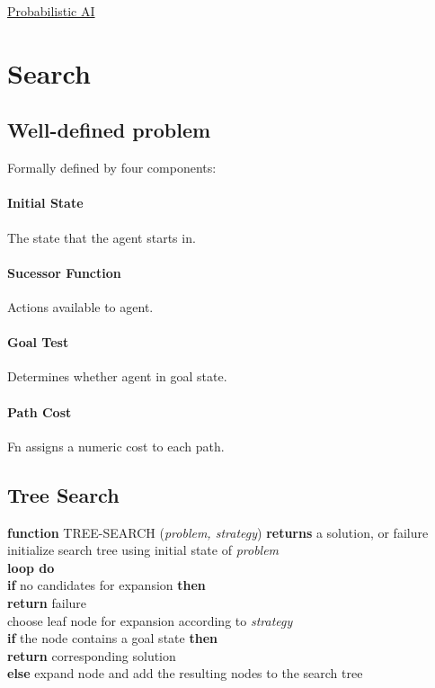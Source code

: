 \begin{multicols}{4}

\setlength{\premulticols}{1pt}
\setlength{\postmulticols}{1pt}
\setlength{\multicolsep}{1pt}
\setlength{\columnsep}{2pt}

\begin{center}
     \Large{\underline{Probabilistic AI}} \\
\end{center}

\section{Search}
\subsection{Well-defined problem}
Formally defined by four components:
\paragraph{Initial State} The state that the agent starts in.
\paragraph{Sucessor Function} Actions available to agent.
\paragraph{Goal Test} Determines whether agent in goal state.
\paragraph{Path Cost} Fn assigns a numeric cost to each path.

\subsection{Tree Search}
\textbf{function} TREE-SEARCH (\textit{problem, strategy}) \textbf{returns} a solution, or failure\\
initialize search tree using initial state of \textit{problem}\\
\textbf{loop do}\\
    \textbf{if} no candidates for expansion \textbf{then}\\
        \textbf{return} failure\\
    choose leaf node for expansion according to \textit{strategy}\\
    \textbf{if} the node contains a goal state \textbf{then}\\
        \textbf{return} corresponding solution\\
    \textbf{else} expand node and add the resulting nodes to the search tree


\end{multicols}
